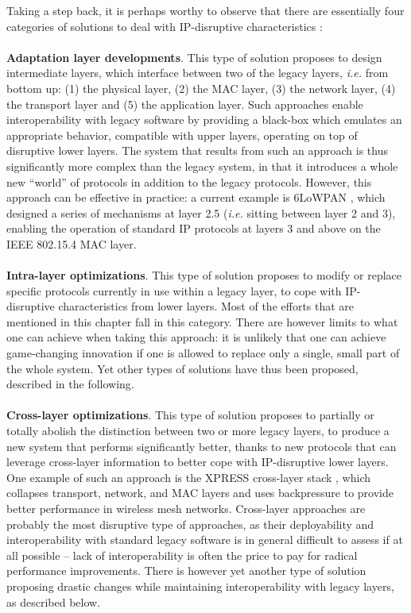 %
Taking a step back, it is perhaps worthy to observe that there are essentially four categories of solutions to deal with IP-disruptive characteristics \cite{EB-HABILITATION2013}: \ \\ \ \\
%
{\bf Adaptation layer developments}. This type of solution proposes to design intermediate layers, which interface between two of the legacy layers, {\em i.e.} from bottom up: (1) the physical layer, (2) the MAC layer, (3) the network layer, (4) the transport layer and (5) the application layer. Such approaches enable interoperability with legacy software by providing a black-box which emulates an appropriate behavior, compatible with upper layers, operating on top of disruptive lower layers. The system that results from such an approach is thus significantly more complex than the legacy system, in that it introduces a whole new ``world'' of protocols in addition to the legacy protocols. However, this approach can be effective in practice: a current example is 6LoWPAN \cite{6LOWPAN-WG}, which designed a series of mechanisms at layer 2.5 ({\em i.e.} sitting between layer 2 and 3), enabling the operation of standard IP protocols at layers 3 and above on the IEEE 802.15.4 MAC layer.\ \\ \ \\
%
{\bf Intra-layer optimizations}. This type of solution proposes to modify or replace specific protocols currently in use within a legacy layer, to cope with IP-disruptive characteristics from lower layers. Most of the efforts that are mentioned in this chapter fall in this category. There are however limits to what one can achieve when taking this approach: it is unlikely that one can achieve game-changing innovation if one is allowed to replace only a single, small part of the whole system. Yet other types of solutions have thus been proposed, described in the following. \ \\ \ \\
%
{\bf Cross-layer optimizations}. This type of solution proposes to partially or totally abolish the distinction between two or more legacy layers, to produce a new system that performs significantly better, thanks to new protocols that can leverage cross-layer information to better cope with IP-disruptive lower layers. One example of such an approach is the XPRESS cross-layer stack \cite{laufer11}, which collapses transport, network, and MAC layers and uses backpressure to provide better performance in wireless mesh networks. Cross-layer approaches are probably the most disruptive type of approaches, as their deployability and interoperability with standard legacy software is in general difficult to assess if at all possible -- lack of interoperability is often the price to pay for radical performance improvements. There is however yet another type of solution proposing drastic changes while maintaining interoperability with legacy layers, as described below.\ \\ \ \\
